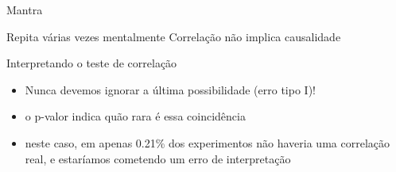 \documentclass{beamer}
\begin{document}
\begin{frame}[label=mantra]{Mantra}
  \begin{block}{Repita várias vezes mentalmente}
    \LARGE
    \centering
    Correlação não implica causalidade
  \end{block}
\end{frame}

\begin{frame}{\scriptsize Interpretando o teste de correlação}
  \begin{itemize}
    \footnotesize
  \item Nunca devemos ignorar a última possibilidade (erro tipo I)!
    \bigskip
  \item o p-valor indica quão rara é essa coincidência
    \bigskip
  \item neste caso, em apenas 0.21\% dos experimentos não haveria uma
    correlação real, e estaríamos cometendo um erro de interpretação
  \end{itemize}
\end{frame}


\end{document}
